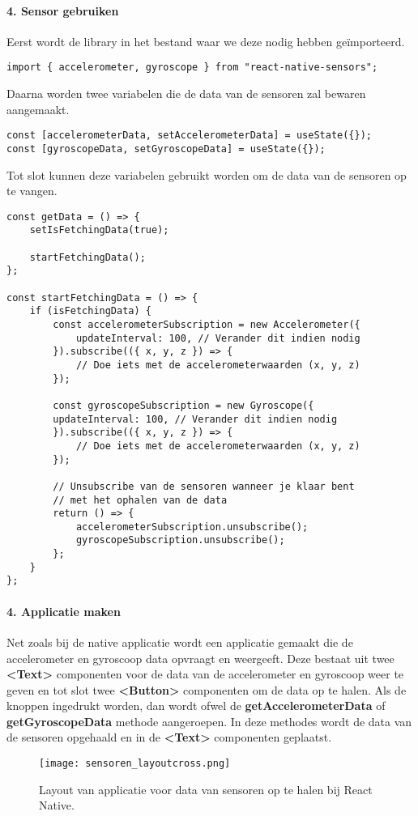 \paragraph{4. Sensor gebruiken}
Eerst wordt de library in het bestand waar we deze nodig hebben geïmporteerd.
\begin{verbatim}
import { accelerometer, gyroscope } from "react-native-sensors";
\end{verbatim}
Daarna worden twee variabelen die de data van de sensoren zal bewaren aangemaakt.
\begin{verbatim}
const [accelerometerData, setAccelerometerData] = useState({});
const [gyroscopeData, setGyroscopeData] = useState({});
\end{verbatim}
Tot slot kunnen deze variabelen gebruikt worden om de data van de sensoren op te vangen.
\begin{verbatim}
const getData = () => {
    setIsFetchingData(true);

    startFetchingData();
};

const startFetchingData = () => {
    if (isFetchingData) {
        const accelerometerSubscription = new Accelerometer({
            updateInterval: 100, // Verander dit indien nodig
        }).subscribe(({ x, y, z }) => {
            // Doe iets met de accelerometerwaarden (x, y, z)
        });

        const gyroscopeSubscription = new Gyroscope({
        updateInterval: 100, // Verander dit indien nodig
        }).subscribe(({ x, y, z }) => {
            // Doe iets met de accelerometerwaarden (x, y, z)
        });

        // Unsubscribe van de sensoren wanneer je klaar bent 
        // met het ophalen van de data
        return () => {
            accelerometerSubscription.unsubscribe();
            gyroscopeSubscription.unsubscribe();
        };
    }
};
\end{verbatim}

\paragraph{4. Applicatie maken}
Net zoals bij de native applicatie wordt een applicatie gemaakt die de accelerometer en gyroscoop data 
opvraagt en weergeeft. Deze bestaat uit twee \textbf{<Text>} componenten voor de data van de
accelerometer en gyroscoop weer te geven en tot slot twee \textbf{<Button>} componenten om de 
data op te halen. Als de knoppen ingedrukt worden, dan wordt ofwel de
\textbf{getAccelerometerData} of \textbf{getGyroscopeData} methode aangeroepen. In deze methodes wordt de data 
van de sensoren opgehaald en in de \textbf{<Text>} componenten geplaatst.
\begin{figure}[H]
    \centering
    \texttt{[image: sensoren\_layoutcross.png]}
    \caption{Layout van applicatie voor data van sensoren op te halen bij React Native.}
\end{figure}
